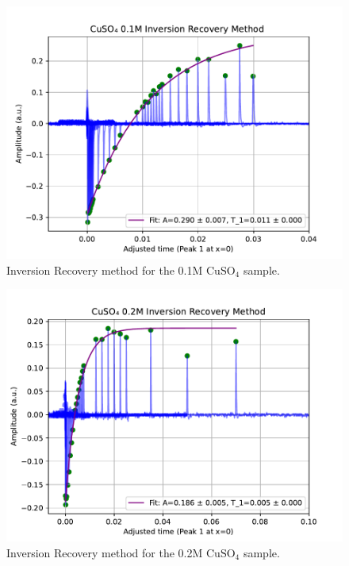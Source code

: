 \documentclass[12pt]{article}
\begin{document}
\begin{figure}[H]
  \includegraphics[scale = 0.6]{IR_0.1.pdf}
  \caption{Inversion Recovery method for the 0.1M $\text{CuSO}_4$ sample.}
  \label{IR_0.1.pdf}
\end{figure}
\begin{figure}[H]
  \includegraphics[scale = 0.6]{IR_0.2.pdf}
  \caption{Inversion Recovery method for the 0.2M $\text{CuSO}_4$ sample.}
  \label{IR_0.2.pdf}
\end{figure}
\end{document}

